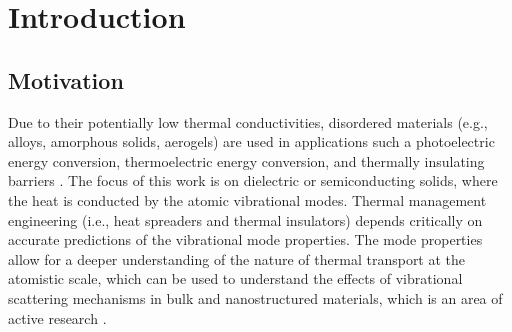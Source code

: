 \chapter{Introduction}

\section{Motivation}

Due to their potentially low thermal conductivities, 
disordered materials (e.g., alloys, amorphous solids, aerogels) 
are used in 
applications such a photoelectric energy conversion, 
thermoelectric energy conversion, and thermally insulating barriers 
\cite{graebner_phonon_1986,cahill_lattice_1988,lu_thermal_1992,
chen_recent_2003,clarke_thermal_2005,snyder_complex_2008,
minnich_bulk_2009,toberer_phonon_2011,zebarjadi_perspectives_2012,
schiffres_gas_2012,duda_exceptionally_2013}. 
The focus of this work is on dielectric or semiconducting solids,  
where the heat is conducted by the atomic vibrational modes. 
Thermal management engineering (i.e., heat spreaders and thermal insulators) 
depends critically on accurate predictions of the vibrational mode 
properties. 
The mode properties allow 
for a deeper understanding of the nature of thermal transport at the 
atomistic scale, which can be used to understand the 
effects of vibrational scattering mechanisms in bulk and 
nanostructured materials, which is an area of 
active research \cite{chen_recent_2003,snyder_complex_2008,
turney_predicting_2009,minnich_bulk_2009,toberer_phonon_2011,
mcgaughey_size-dependent_2011,zebarjadi_perspectives_2012,
mcgaughey_nanostructure_2012,regner_broadband_2013}. 

